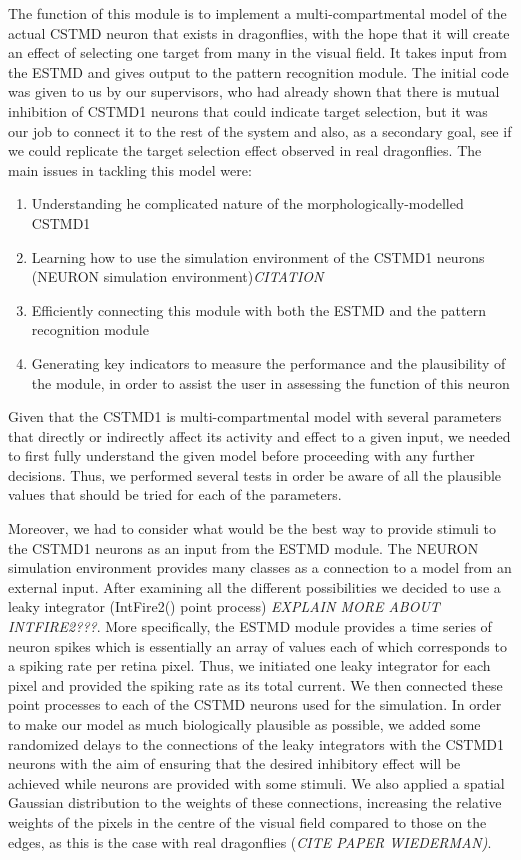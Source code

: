 \documentclass[a4paper,11pt]{article}
\begin{document}
The function of this module is to implement a multi-compartmental model of the actual CSTMD neuron that exists in dragonflies, with the hope that it will create an effect of selecting one target from many in the visual field. It takes input from the ESTMD and gives output to the pattern recognition module. The initial code was given to us by our supervisors, who had already shown that there is mutual inhibition of CSTMD1 neurons that could indicate target selection, but it was our job to connect it to the rest of the system and also, as a secondary goal, see if we could replicate the target selection effect observed in real dragonflies. The main issues in tackling this model were:
\begin{enumerate}
	\item Understanding he complicated nature of the morphologically-modelled CSTMD1
	\item Learning how to use the simulation environment of the CSTMD1 neurons (NEURON simulation environment)\emph{\color{red}CITATION}
	\item Efficiently connecting this module with both the ESTMD and the pattern recognition module
	\item Generating key indicators to measure the performance and the plausibility of the module, in order to assist the user in assessing the function of this neuron
\end{enumerate}

Given that the CSTMD1 is multi-compartmental model with several parameters that directly or indirectly affect its activity and effect to a given input, we needed to first fully understand the given model before proceeding with any further decisions. Thus, we performed several tests in order be aware of all the plausible values that should be tried for each of the parameters.

Moreover, we had to consider what would be the best way to provide stimuli to the CSTMD1 neurons as an input from the ESTMD module. The NEURON simulation environment provides many classes as a connection to a model from an external input. After examining all the different possibilities we decided to use a leaky integrator (IntFire2() point process) 
\emph{\color{red}EXPLAIN MORE ABOUT INTFIRE2???}. More specifically, the ESTMD module provides a time series of neuron spikes which is essentially an array of values each of which corresponds to a spiking rate per retina pixel. Thus, we initiated one leaky integrator for each pixel and provided the spiking rate as its total current. We then connected these point processes to each of the CSTMD neurons used for the simulation. In order to make our model as much biologically plausible as possible, we added some randomized delays to the connections of the leaky integrators with the CSTMD1 neurons with the aim of ensuring that the desired inhibitory effect will be achieved while neurons are provided with some stimuli. We also applied a spatial Gaussian distribution to the weights of these connections, increasing the relative weights of the pixels in the centre of the visual field compared to those on the edges, as this is the case with real dragonflies (\emph{\color{red}CITE PAPER WIEDERMAN)}.
\end{document}

